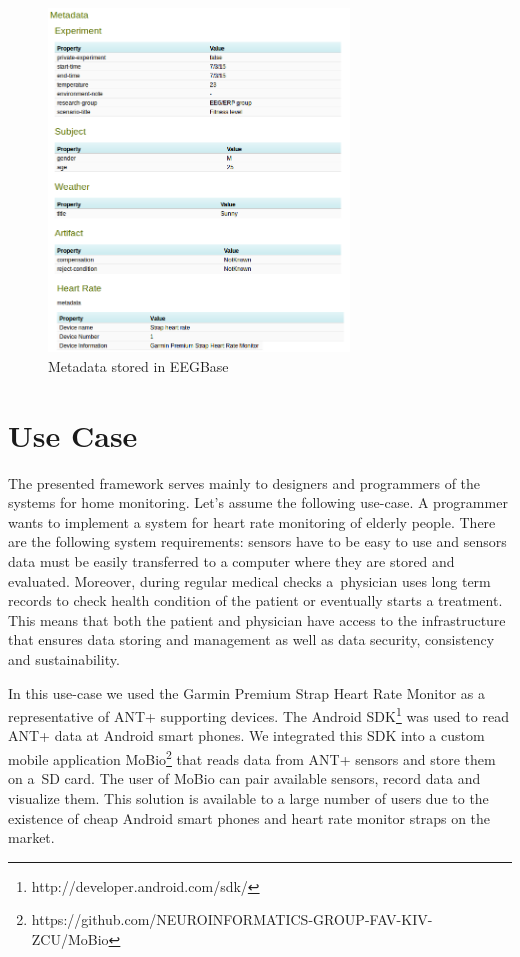 \documentclass[conference]{IEEEtran}
\begin{document}
\begin{figure}
  \centering\includegraphics[width=8cm]{portal_example.png}
  \caption{Metadata stored in EEGBase}
  \label{fig:EEGBase}
 \end{figure}


\section{Use Case}\label{sec:use-case}

The presented framework serves mainly to designers and programmers of the systems for home monitoring. Let's assume the following use-case. A programmer wants to implement a system for heart rate monitoring of elderly people. There are the following system requirements: sensors have to be easy to use and  sensors data must be easily transferred to a computer where they are stored and evaluated. Moreover, during regular medical checks a~physician uses long term records to check health condition of the patient or eventually starts a treatment. This means that both the patient and physician have access to the infrastructure that ensures data storing and management as well as data security, consistency and sustainability.

In this use-case we used the Garmin Premium Strap Heart Rate Monitor as a representative of ANT+ supporting devices. The Android SDK\footnote{http://developer.android.com/sdk/} was used to read ANT+ data at Android smart phones. We integrated this SDK into a custom mobile application MoBio\footnote{https://github.com/NEUROINFORMATICS-GROUP-FAV-KIV-ZCU/MoBio} that reads data from ANT+ sensors and store them on a~SD card. The user of MoBio can pair available sensors, record data and visualize them. This solution is available to a large number of users due to the existence of cheap Android smart phones and heart rate monitor straps on the market.
\end{document}
